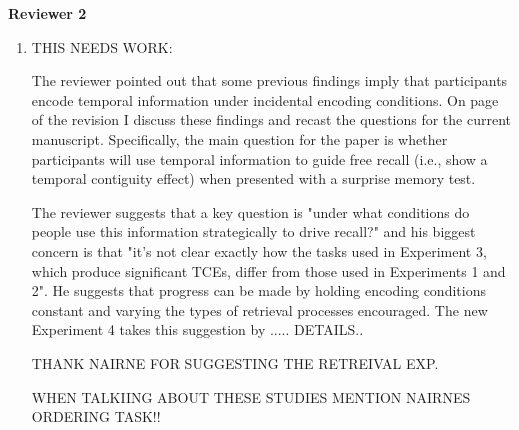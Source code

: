 \documentclass[12pt]{article}
\begin{document}
\vspace{20pt}

\textbf{\large{Reviewer 2}}

\begin{enumerate}

	\item 
	THIS NEEDS WORK:

	The reviewer pointed out that some previous findings imply that participants encode temporal information under incidental encoding conditions. On page \pageref{TODO-8} of the revision I discuss these findings and recast the questions for the current manuscript. Specifically, the main question for the paper is whether participants will use temporal information to guide free recall (i.e., show a temporal contiguity effect) when presented with a surprise memory test.

	The reviewer suggests that a key question is "under what conditions do people use this information strategically to drive recall?" and his biggest concern is that "it's not clear exactly how the tasks used in Experiment 3, which produce significant TCEs, differ from those used in Experiments 1 and 2". He suggests that progress can be made by holding encoding conditions constant and varying the types of retrieval processes encouraged. The new Experiment 4 takes this suggestion by ..... DETAILS..

	THANK NAIRNE FOR SUGGESTING THE RETREIVAL EXP. 

	WHEN TALKIING ABOUT THESE STUDIES MENTION NAIRNES ORDERING TASK!!


\end{enumerate}
\end{document}
